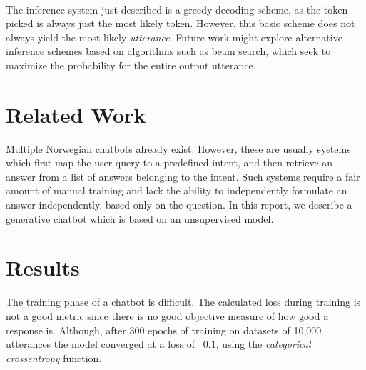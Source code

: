 \documentclass{article}
\begin{document}
\paragraph{}
The inference system just described is a greedy decoding scheme, as the token
picked is always just the most likely token. However, this basic scheme does
not always yield the most likely \emph{utterance}. Future work might explore
alternative inference schemes based on algorithms such as beam search, which
seek to maximize the probability for the entire output utterance.


\section*{Related Work}
Multiple Norwegian chatbots already exist. However, these are usually systems
which first map the user query to a predefined intent, and then retrieve an
answer from a list of answers belonging to the intent. Such systems require a
fair amount of manual training and lack the ability to independently formulate
an answer independently, based only on the question.  In this report, we
describe a generative chatbot which is based on an unsupervised model.

\section*{Results}

The training phase of a chatbot is difficult. The calculated loss during
training is not a good metric since there is no good objective measure of how
good a response is. Although, after 300 epochs of training on datasets of
10,000 utterances the model converged at a loss of ~0.1, using the
\textit{categorical crossentropy} function.
\end{document}
